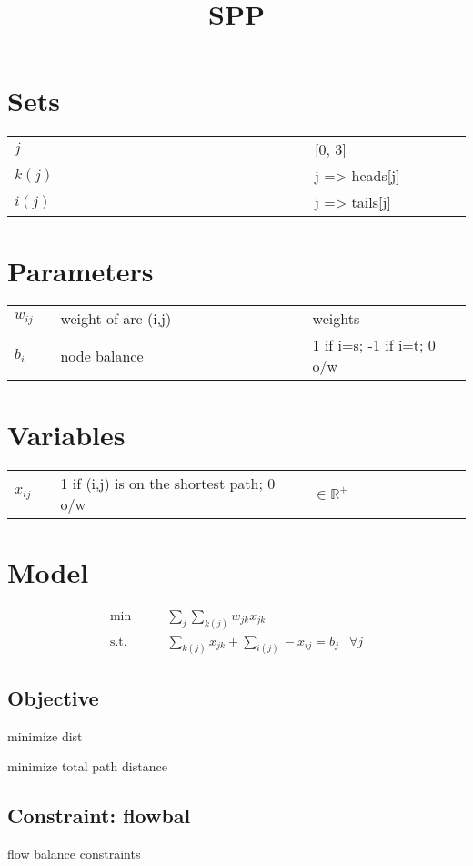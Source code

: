 \documentclass{article}
\title{SPP}
\begin{document}
\maketitle

\section{Sets}
\begin{tabular}{ p{0.10\linewidth} p{0.55\linewidth} p{0.35\linewidth} }
 $j$ &  & [0, 3] \\ 
 $k\left(j\right)$ &  & j => heads[j] \\ 
 $i\left(j\right)$ &  & j => tails[j] \\ 
\end{tabular}


\section{Parameters}
\begin{tabular}{ p{0.10\linewidth} p{0.55\linewidth} p{0.35\linewidth} }
 $w_{ij}$ & weight of arc (i,j) & weights \\ 
 $b_{i}$ & node balance & 1 if i=s; -1 if i=t; 0 o/w \\ 
\end{tabular}


\section{Variables}
\begin{tabular}{ p{0.10\linewidth} p{0.55\linewidth} p{0.35\linewidth} }
 $x_{ij}$ & 1 if (i,j) is on the shortest path; 0 o/w & $\in \mathbb{R}^{+}$ \\ 
\end{tabular}


\section{Model}
\begin{align}
\min \qquad & \sum_{j}\sum_{k(j)}w_{jk}x_{jk} \label{MODELOBJECTIVE}  \\ 
\text{s.t.} \qquad  & \sum_{k(j)}x_{jk} + \sum_{i(j)}-x_{ij} = b_{j} & \forall j \label{MODELCONSTRAINT0} 
\end{align}
\subsection{Objective}
minimize dist


minimize total path distance
\subsection{Constraint: flowbal}


flow balance constraints
\end{document}
